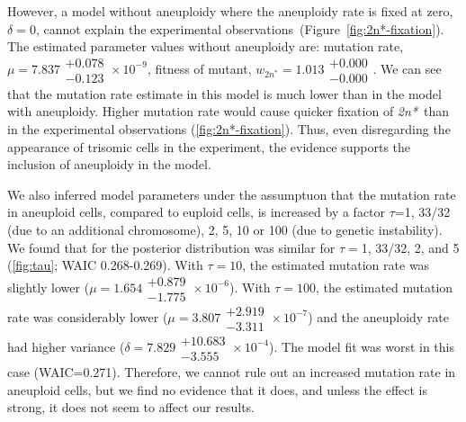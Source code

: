 \documentclass[12pt]{extarticle}
\newcommand{\eumt}{\emph{2n*}}
\begin{document}
However, a model without aneuploidy where the aneuploidy rate is fixed at zero, $\delta=0$, cannot explain the experimental observations~(Figure~\ref{fig:2n*-fixation}). The estimated parameter values without aneuploidy are: 
mutation rate, $\mu=7.837\substack{+0.078 \\ -0.123}\times10^{-9}$,
fitness of mutant, $w_{2n^*}=1.013\substack{+0.000 \\ -0.000}$. 
We can see that the mutation rate estimate in this model is much lower than in the model with aneuploidy. Higher mutation rate would cause quicker fixation of \eumt\ than in the experimental observations (\cref{fig:2n*-fixation}). Thus, even disregarding the appearance of trisomic cells in the experiment, the evidence supports the inclusion of aneuploidy in the model.

We also inferred model parameters under the assumptuon that the mutation rate in aneuploid cells, compared to euploid cells, is increased by a factor $\tau$=1, 33/32 (due to an additional chromosome), 2, 5, 10 or 100 (due to genetic instability).
We found that for the posterior distribution was similar for $\tau=$1, 33/32, 2, and 5 (\cref{fig:tau}; WAIC 0.268-0.269).
With $\tau=10$, the estimated mutation rate was slightly lower ($\mu=1.654\substack{+0.879 \\ -1.775}\times10^{-6}$). 
With $\tau=100$, the estimated mutation rate was considerably lower ($\mu=3.807\substack{+2.919 \\ -3.311}\times10^{-7}$) and the aneuploidy rate had higher variance ($\delta=7.829\substack{+10.683 \\ -3.555}\times10^{-4}$). The model fit was worst in this case (WAIC=0.271). 
Therefore, we cannot rule out an increased mutation rate in aneuploid cells, but we find no evidence that it does, and unless the effect is strong, it does not seem to affect our results.
\end{document}
